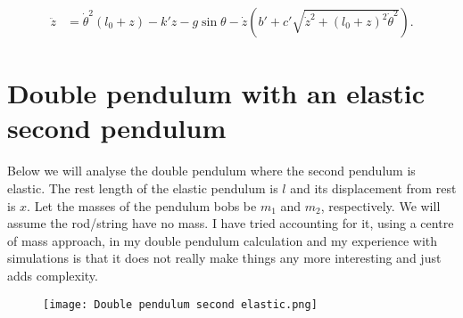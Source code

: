 \documentclass[12pt,a4paper,portrait]{article}
\begin{document}
\begin{align*}
	\ddot{z} &= \dot{\theta}^2(l_0+z) - k'z - g\sin{\theta} -\dot{z}\left(b'+c'\sqrt{\dot{z}^2+(l_0+z)^2\dot{\theta}^2}\right).
\end{align*}

\section{Double pendulum with an elastic second pendulum}
Below we will analyse the double pendulum where the second pendulum is elastic. The rest length of the elastic pendulum is $l$ and its displacement from rest is $x$. Let the masses of the pendulum bobs be $m_1$ and $m_2$, respectively. We will assume the rod/string have no mass. I have tried accounting for it, using a centre of mass approach, in my double pendulum calculation and my experience with simulations is that it does not really make things any more interesting and just adds complexity. 
\begin{figure}[H]
	\texttt{[image: Double pendulum second elastic.png]}
\end{figure}

\tableofcontents
\end{document}

